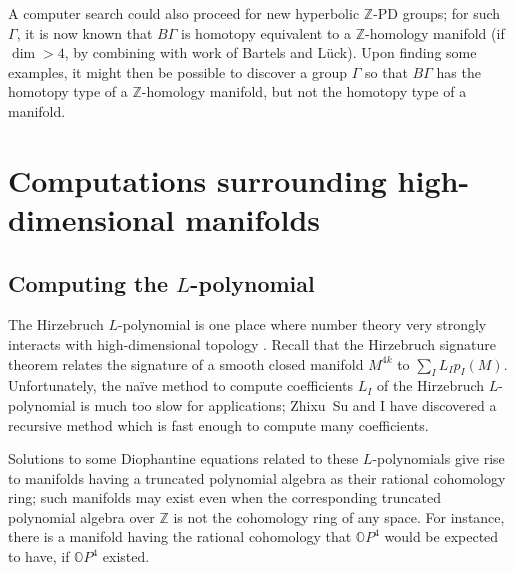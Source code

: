 \documentclass[12pt]{amsart}
\theoremstyle{definition}
\newcommand{\Z}{\mathbb{Z}}
\begin{document}
A computer search could also proceed for new hyperbolic $\Z$-PD
groups; for such $\Gamma$, it is now known that $B\Gamma$ is homotopy
equivalent to a $\Z$-homology manifold (if $\dim > 4$, by combining
\cite{MR1394965} with work of Bartels and L\"uck).  Upon finding some
examples, it might then be possible to discover a group $\Gamma$ so
that $B\Gamma$ has the homotopy type of a $\Z$-homology manifold, but
not the homotopy type of a manifold.

\section{Computations surrounding high-dimensional manifolds}

\subsection{Computing the $L$-polynomial}
\label{subsection:computing-the-l-polynomial}

The Hirzebruch $L$-polynomial is one place where number theory very
strongly interacts with high-dimensional topology \cite{MR339202}.
Recall that the Hirzebruch signature theorem relates the signature of
a smooth closed manifold $M^{4k}$ to $\sum_I L_I
p_I(M)$. Unfortunately, the na\"ive method to compute coefficients
$L_I$ of the Hirzebruch $L$-polynomial is much too slow for
applications; Zhixu~Su and I have discovered a recursive method which
is fast enough to compute many coefficients.

Solutions to some Diophantine equations related to these
$L$-polynomials give rise to manifolds having a truncated polynomial
algebra as their rational cohomology ring; such manifolds may exist
even when the corresponding truncated polynomial algebra over $\Z$ is
not the cohomology ring of any space.  For instance, there is a
manifold having the rational cohomology that $\mathbb{O}P^4$ would be expected
to have, if $\mathbb{O}P^4$ existed.
\end{document}
